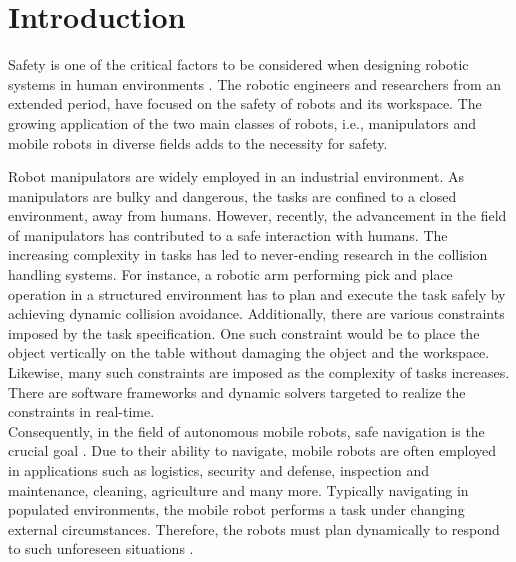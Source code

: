 

	

\chapter{Introduction}
\label{chap:Intro}

Safety is one of the critical factors to be considered when designing robotic systems in human environments \cite{shin2008hybrid}. The robotic engineers and researchers from an extended period, have focused on the safety of robots and its workspace. The growing application of the two main classes of robots, i.e., manipulators and mobile robots in diverse fields adds to the necessity for safety. 


Robot manipulators are widely employed in an industrial environment. As manipulators are bulky and dangerous, the tasks are confined to a closed environment, away from humans. However, recently, the advancement in the field of manipulators has contributed to a safe interaction with humans. The increasing complexity in tasks has led to never-ending research in the collision handling systems. For instance, a robotic arm performing pick and place operation in a structured environment has to plan and execute the task safely by achieving dynamic collision avoidance.
Additionally, there are various constraints imposed by the task specification. One such constraint would be to place the object vertically on the table without damaging the object and the workspace. Likewise, many such constraints are imposed as the complexity of tasks increases. There are software frameworks and dynamic solvers targeted to realize the constraints in real-time. \\

Consequently, in the field of autonomous mobile robots, safe navigation is the crucial goal \cite{fox1997dynamic}. Due to their ability to navigate, mobile robots are often employed in applications such as logistics, security and defense, inspection and maintenance, cleaning, agriculture and many more. Typically navigating in populated environments, the mobile robot performs a task under changing external circumstances. Therefore, the robots must plan dynamically to respond to such unforeseen situations \cite{fox1997dynamic}. \\

